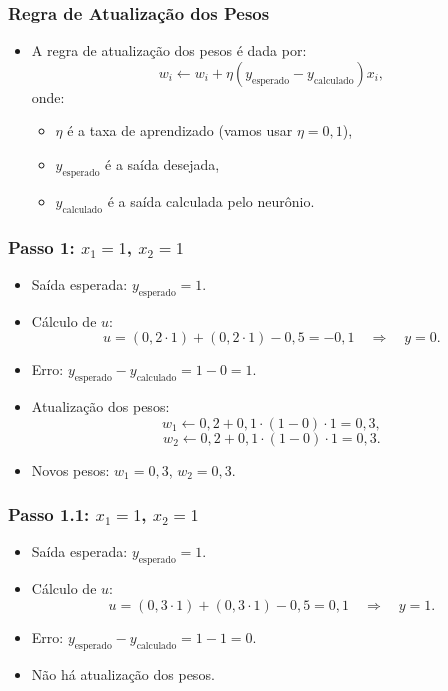 \documentclass{beamer}
\begin{document}
\begin{frame}
\frametitle{Regra de Atualização dos Pesos}
\begin{itemize}
    \item A regra de atualização dos pesos é dada por:
    \[
    w_i \leftarrow w_i + \eta (y_{\text{esperado}} - y_{\text{calculado}}) x_i,
    \]
    onde:
    \begin{itemize}
        \item \( \eta \) é a taxa de aprendizado (vamos usar \( \eta = 0,1 \)),
        \item \( y_{\text{esperado}} \) é a saída desejada,
        \item \( y_{\text{calculado}} \) é a saída calculada pelo neurônio.
    \end{itemize}
\end{itemize}
\end{frame}

\begin{frame}
\frametitle{Passo 1: \( x_1 = 1 \), \( x_2 = 1 \)}
\begin{itemize}
    \item Saída esperada: \( y_{\text{esperado}} = 1 \).
    \item Cálculo de \( u \):
    \[
    u = (0,2 \cdot 1) + (0,2 \cdot 1) - 0,5 = -0,1 \quad \Rightarrow \quad y = 0.
    \]
    \item Erro: \( y_{\text{esperado}} - y_{\text{calculado}} = 1 - 0 = 1 \).
    \item Atualização dos pesos:
    \[
    w_1 \leftarrow 0,2 + 0,1 \cdot (1-0) \cdot 1 = 0,3,
    \]
    \[
    w_2 \leftarrow 0,2 + 0,1 \cdot (1-0) \cdot 1 = 0,3.
    \]
    \item Novos pesos: \( w_1 = 0,3 \), \( w_2 = 0,3 \).
\end{itemize}
\end{frame}

\begin{frame}
\frametitle{Passo 1.1: \( x_1 = 1 \), \( x_2 = 1 \)}
\begin{itemize}
    \item Saída esperada: \( y_{\text{esperado}} = 1 \).
    \item Cálculo de \( u \):
    \[
    u = (0,3 \cdot 1) + (0,3 \cdot 1) - 0,5 = 0,1 \quad \Rightarrow \quad y = 1.
    \]
    \item Erro: \( y_{\text{esperado}} - y_{\text{calculado}} = 1 - 1 = 0 \).
   \item Não há atualização dos pesos.
\end{itemize}
\end{frame}
\end{document}

